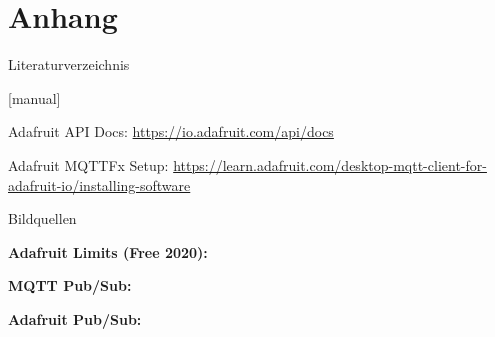 \section{Anhang}

\begin{frame}{Literaturverzeichnis}
    \begin{thebibliography}{Längste Bezeichnung}
        [manual]
           
           
            \newblock Adafruit API Docs: \url{https://io.adafruit.com/api/docs}
           
            \newblock Adafruit MQTTFx Setup: \url{https://learn.adafruit.com/desktop-mqtt-client-for-adafruit-io/installing-software}
           
           
           
    \end{thebibliography}
\end{frame}

{
    \tiny
    \begin{frame}{Bildquellen}
    
          \textbf{Adafruit Limits (Free 2020):} \\
           \medskip
        
           \textbf{MQTT Pub/Sub:} \\
           \medskip
           
            \textbf{Adafruit Pub/Sub:} \\
           \medskip
        
        
        
        \end{frame}
}